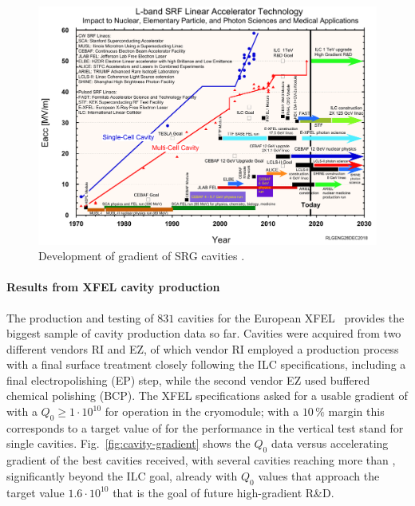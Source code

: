 \begin{figure}[htbp]
   \includegraphics[width=\hsize]{chapters/figures/LBandSRFNbCavityGradientEvolution_ProjectImpact_rev28dec2018}
\caption{Development of gradient of SRG cavities
\cite[updated]{Geng:2015glc}.
}
\label{fig:gradients}
\end{figure}


\paragraph{Results from XFEL cavity production}

The production and testing of $831$ cavities for the European XFEL~\cite{Singer:2016fbf,Reschke:2017gjp} provides the biggest sample of cavity production data so far. 
Cavities were acquired from two different vendors RI and EZ,
of which vendor RI employed a production process with a final surface treatment closely following the ILC specifications, including a final electropolishing (EP) step,
while the second vendor EZ used buffered chemical polishing (BCP).
The XFEL specifications asked for a usable gradient of  with a $Q_0 \ge 1  \cdot 10^{10}$ for operation in the cryomodule;
with a $10\,\%$ margin this corresponds to a target value of  for the performance in the vertical test stand for single cavities.
Fig.~\ref{fig:cavity-gradient} shows the $Q_0$ data versus accelerating gradient of the best cavities received, with several cavities reaching more than , significantly beyond the ILC goal, already with $Q_0$ values that approach the target value $1.6\cdot10^{10}$ that is the goal of future high-gradient R\&D.

